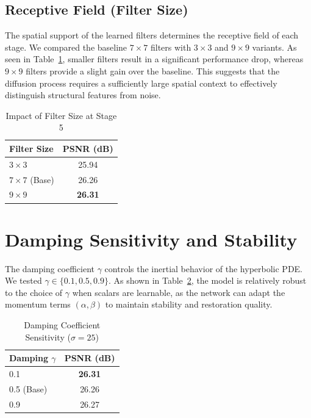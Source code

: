 \documentclass[11pt]{article}
\begin{document}
\subsection{Receptive Field (Filter Size)}

The spatial support of the learned filters determines the receptive field of each stage. We compared the baseline $7 \times 7$ filters with $3 \times 3$ and $9 \times 9$ variants. As seen in Table~\ref{tab:filter_ablation}, smaller filters result in a significant performance drop, whereas $9 \times 9$ filters provide a slight gain over the baseline. This suggests that the diffusion process requires a sufficiently large spatial context to effectively distinguish structural features from noise.

\begin{table}[h]
	\centering
	\caption{Impact of Filter Size at Stage 5}
	\label{tab:filter_ablation}
	\begin{tabular}{l c}
		\toprule
		Filter Size & PSNR (dB)      \\
		\midrule
		$3 \times 3$ & 25.94          \\
		$7 \times 7$ (Base) & 26.26 \\
		$9 \times 9$ & \textbf{26.31} \\
		\bottomrule
	\end{tabular}
\end{table}

\section{Damping Sensitivity and Stability}

The damping coefficient $\gamma$ controls the inertial behavior of the hyperbolic PDE. We tested $\gamma \in \{0.1, 0.5, 0.9\}$. As shown in Table~\ref{tab:gamma_ablation}, the model is relatively robust to the choice of $\gamma$ when scalars are learnable, as the network can adapt the momentum terms $(\alpha, \beta)$ to maintain stability and restoration quality.

\begin{table}[h]
	\centering
	\caption{Damping Coefficient Sensitivity ($\sigma=25$)}
	\label{tab:gamma_ablation}
	\begin{tabular}{l c}
		\toprule
		Damping $\gamma$ & PSNR (dB)      \\
		\midrule
		0.1             & \textbf{26.31} \\
		0.5 (Base)      & 26.26          \\
		0.9             & 26.27          \\
		\bottomrule
	\end{tabular}
\end{table}
\end{document}

